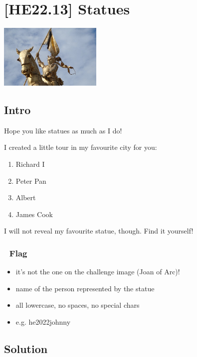 
\hypertarget{he22.13}{%
\chapter{[HE22.13] Statues}\label{he22.13}}

\begin{marginfigure}
	\includegraphics[width=49mm]{level4/challenge13.jpg}
\end{marginfigure}
\section{Intro}
Hope you like statues as much as I do!

I created a little tour in my favourite city for you:

\begin{enumerate}
\item    Richard I
\item     Peter Pan
\item     Albert
\item     James Cook
\end{enumerate}

I will not reveal my favourite statue, though. Find it yourself!

\subsection{{\NotoEmoji 🚩} Flag}

\begin{itemize}
	\item    it's not the one on the challenge image (Joan of Arc)!
	\item    name of the person represented by the statue
	\item    all lowercase, no spaces, no special chars
	\item    e.g. he2022{johnny} 
\end{itemize}

\section{Solution}\label{hv22.13solution}

